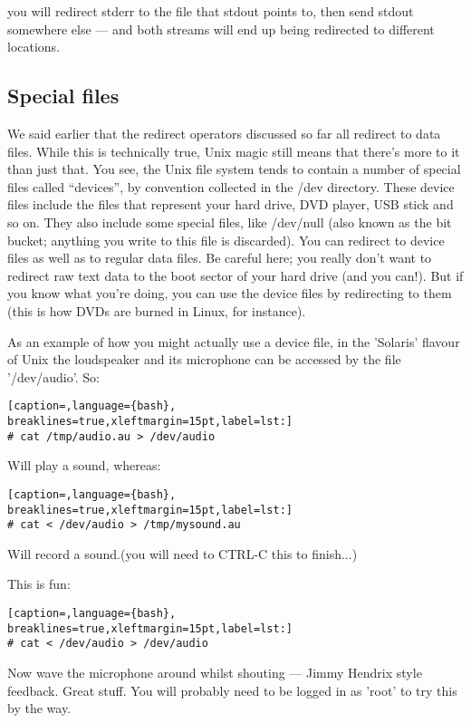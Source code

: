 you will redirect stderr to the file that stdout points to, then send stdout
somewhere else --- and both streams will end up being redirected to different
locations.

\subsection{Special files}
We said earlier that the redirect operators discussed so far all redirect to
data files. While this is technically true, Unix magic still means that there's
more to it than just that. You see, the Unix file system tends to contain a
number of special files called ``devices'', by convention collected in the /dev
directory. These device files include the files that represent your hard drive,
DVD player, USB stick and so on. They also include some special files, like
/dev/null (also known as the bit bucket; anything you write to this file is
discarded). You can redirect to device files as well as to regular data files.
Be careful here; you really don't want to redirect raw text data to the boot
sector of your hard drive (and you can!). But if you know what you're doing,
you can use the device files by redirecting to them (this is how DVDs are
burned in Linux, for instance).

As an example of how you might actually use a device file, in the 'Solaris'
flavour of Unix the loudspeaker and its microphone can be accessed by the file
'/dev/audio'. So:
\lstset{basicstyle=\scriptsize, numbers=left, captionpos=b, tabsize=4}
\begin{lstlisting}[caption=,language={bash},
breaklines=true,xleftmargin=15pt,label=lst:]
# cat /tmp/audio.au > /dev/audio
\end{lstlisting}

Will play a sound, whereas:

\lstset{basicstyle=\scriptsize, numbers=left, captionpos=b, tabsize=4}
\begin{lstlisting}[caption=,language={bash},
breaklines=true,xleftmargin=15pt,label=lst:]
# cat < /dev/audio > /tmp/mysound.au
\end{lstlisting}

Will record a sound.(you will need to CTRL-C this to finish...)

This is fun:
\lstset{basicstyle=\scriptsize, numbers=left, captionpos=b, tabsize=4}
\begin{lstlisting}[caption=,language={bash},
breaklines=true,xleftmargin=15pt,label=lst:]
# cat < /dev/audio > /dev/audio
\end{lstlisting}
Now wave the microphone around whilst shouting --- Jimmy Hendrix style
feedback. Great stuff.  You will probably need to be logged in as 'root' to try
this by the way.

